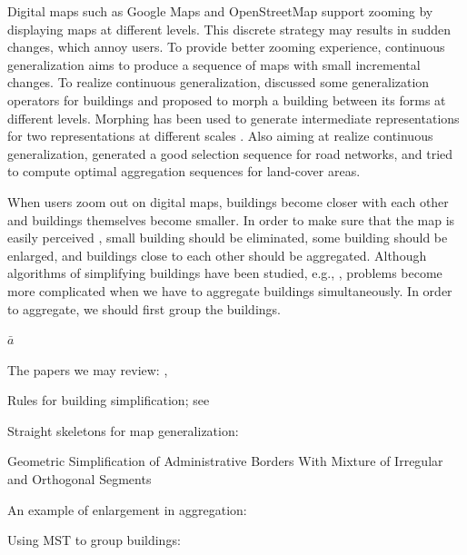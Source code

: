 \documentclass[graybox]{svmult}
\begin{document}
Digital maps such as Google Maps and OpenStreetMap support zooming by 
displaying maps at different levels. 
This discrete strategy may results in sudden changes, which annoy users.
To provide better zooming experience, continuous generalization aims to 
produce 
a sequence of maps with small incremental changes.
To realize continuous generalization, \textcite{Sester2005_CG} discussed some 
generalization operators for buildings and proposed to morph a building 
between 
its forms at different levels. Morphing has been used to generate intermediate 
representations for two representations at different scales 
\parencite{mnwb-mpstc-08,Peng2013_LSA,Deng2015,Peng2016_Admin}. 
Also aiming at 
realize continuous generalization, \textcite{Chimani2014_Eat} generated a good 
selection sequence for road networks, and 
\textcite{Peng2017_AStar} tried to compute optimal aggregation sequences for 
land-cover areas.

When users zoom out on digital maps, buildings become closer with each other 
and buildings themselves become smaller. 
In order to make sure that the map is 
easily perceived \parencite{Weibel1997}, small building should be eliminated, 
some building should be enlarged, and buildings close to each other should be 
aggregated.
Although algorithms of simplifying buildings have been studied, e.g., 
\textcite{Buchin2011_Simp,haunertwolff2010}, problems become more complicated 
when we have to aggregate buildings simultaneously.
In order to aggregate, we should first group the buildings.

$\bar{a}$




\bigskip

The papers we may review:   
\textcite{vanSmaalen2003, Buchin2016, Chaudhry2008, Stoter2009},

Rules for building simplification; see \textcite{Lee2005}

Straight skeletons for map generalization: 
\textcite{Gold2003,Matuk2006}

Geometric Simplification of Administrative Borders With Mixture 
of
Irregular and Orthogonal Segments \parencite{Samsonov2016}

 \parencite{Damen2008}

An example of enlargement in aggregation: 

Using MST to group buildings: \textcite{Zhang2013, 
Cetinkaya2015,Deng2017,Regnauld1996}
\end{document}
